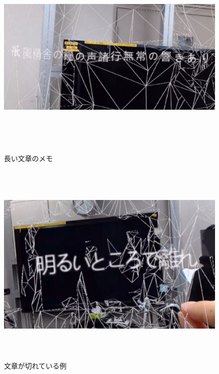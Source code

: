 \documentclass[11pt,a4j, titlepage]{jarticle} %
\begin{document}
\begin{figure}[H]
  \begin{center}
    \includegraphics[clip,height=10.0cm,width=12.0cm]{./gion.eps}
    \caption{長い文章のメモ}
    \label{fig:gion}
  \end{center}
\end{figure}

\begin{figure}[H]
  \begin{center}
    \includegraphics[clip,height=10.0cm,width=12.0cm]{./akarui.eps}
    \caption{文章が切れている例}
    \label{fig:akarui}
  \end{center}
\end{figure}
\end{document}
